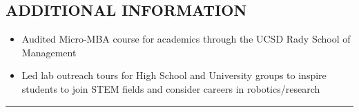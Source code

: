 \documentclass{res}
\begin{document}
\begin{resume}
\section{ADDITIONAL INFORMATION}
\begin{itemize}
\item Audited Micro-MBA course for academics through the UCSD Rady School of Management
\item Led lab outreach tours for High School and University groups to inspire students to join STEM fields and consider careers in robotics/research
\end{itemize}


 \vspace*{-3ex}
\hspace{-8.5ex}\rule{16.5cm}{0.4pt}
 \vspace*{-3ex}

\end{resume}
\end{document}
